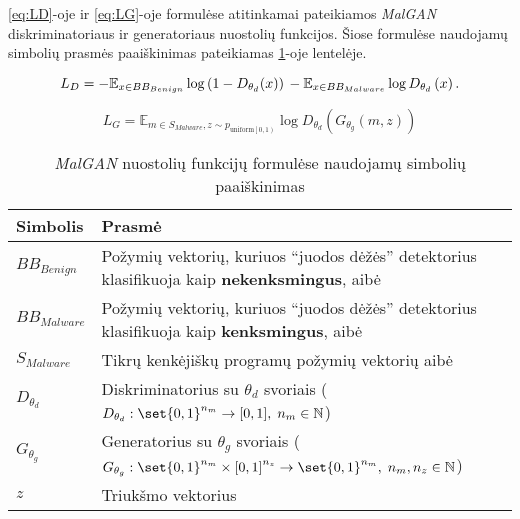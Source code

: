 \ref{eq:LD}-oje ir \ref{eq:LG}-oje formulėse atitinkamai pateikiamos \textit{MalGAN} diskriminatoriaus ir generatoriaus nuostolių funkcijos. Šiose formulėse naudojamų simbolių prasmės paaiškinimas pateikiamas \ref{tab:eq_explain}-oje lentelėje.

\begin{equation}
    L_{D}= -\mathbb{E}_{x\in BB_{Benign}}\log\left(1-D_{\theta_{d}}(x)\right)\\-\mathbb{E}_{x\in BB_{Malware}}\log D_{\theta_{d}}\left(x\right).\label{eq:LD}
\end{equation}

\begin{equation}
    L_G= \mathbb{E}_{m \in S_{Malware},z \sim p_{\mathrm{uniform} \left[0,1\right) }} \log D_{\theta_d} \left(G_{\theta_g} \left(m,z\right) \right)\label{eq:LG}
\end{equation}

\begin{table}[h]
    \begin{small}
        \caption{\textit{MalGAN} nuostolių funkcijų formulėse naudojamų simbolių paaiškinimas}\label{tab:eq_explain}
        \begin{center}
            \begin{tabular}[c]{l|p{}}
                Simbolis       & Prasmė                                                                                                                                           \\
                \midrule
                $BB_{Benign}$  & Požymių vektorių, kuriuos \enquote{juodos dėžės} detektorius klasifikuoja kaip \textbf{nekenksmingus}, aibė                                      \\

                $BB_{Malware}$ & Požymių vektorių, kuriuos \enquote{juodos dėžės} detektorius klasifikuoja kaip \textbf{kenksmingus}, aibė                                        \\

                $S_{Malware}$  & Tikrų kenkėjiškų programų požymių vektorių aibė                                                                                                  \\

                $D_{\theta_d}$ & Diskriminatorius su $\theta_d$ svoriais ($D_{\theta_d}: \set{0,1}^{n_m} \rightarrow [0,1], \; n_m \in \mathbb{N}$)                               \\

                $G_{\theta_g}$ & Generatorius su $\theta_g$ svoriais ($G_{\theta_g}: \set{0,1}^{n_m} \times {[0,1]}^{n_z} \rightarrow \set{0,1}^{n_m}, \; n_m, n_z \in \mathbb{N}$) \\

                $z$            & Triukšmo vektorius                                                                                                                               \\

            \end{tabular}
        \end{center}
    \end{small}
\end{table}
